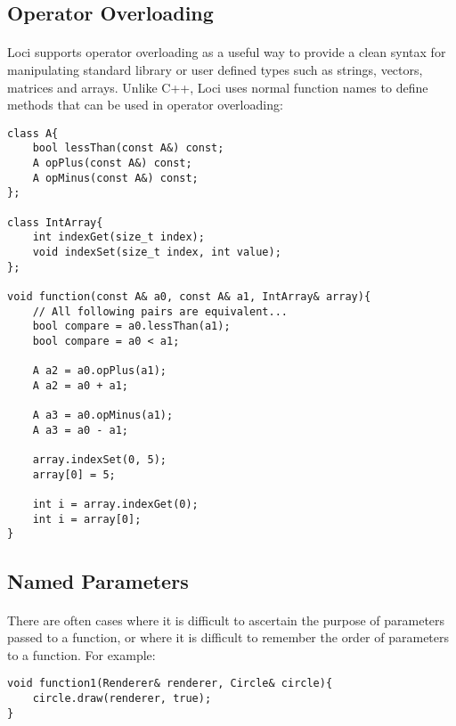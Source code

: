 \documentclass[12pt,twoside,notitlepage]{report}
\begin{document}
\subsection{Operator Overloading}

\paragraph{}
Loci supports operator overloading as a useful way to provide a clean syntax for manipulating standard library or user defined types such as strings, vectors, matrices and arrays. Unlike C++, Loci uses normal function names to define methods that can be used in operator overloading:

\small{
\begin{verbatim}
class A{
    bool lessThan(const A&) const;
    A opPlus(const A&) const;
    A opMinus(const A&) const;
};

class IntArray{
    int indexGet(size_t index);
    void indexSet(size_t index, int value);
};

void function(const A& a0, const A& a1, IntArray& array){
    // All following pairs are equivalent...
    bool compare = a0.lessThan(a1);
    bool compare = a0 < a1;
    
    A a2 = a0.opPlus(a1);
    A a2 = a0 + a1;
    
    A a3 = a0.opMinus(a1);
    A a3 = a0 - a1;
    
    array.indexSet(0, 5);
    array[0] = 5;
    
    int i = array.indexGet(0);
    int i = array[0];
}
\end{verbatim}
}

\subsection{Named Parameters}

\paragraph{}
There are often cases where it is difficult to ascertain the purpose of parameters passed to a function, or where it is difficult to remember the order of parameters to a function. For example:

\small{
\begin{verbatim}
void function1(Renderer& renderer, Circle& circle){
    circle.draw(renderer, true);
}
\end{verbatim}
}
\end{document}
